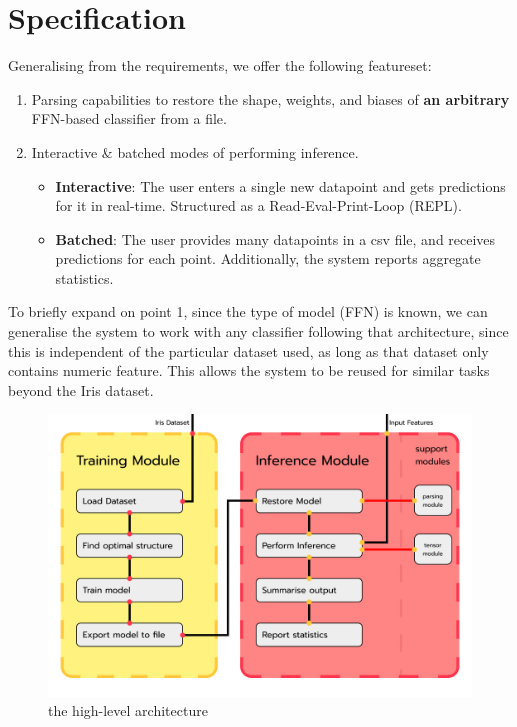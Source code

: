 \documentclass[12pt]{article}
\begin{document}
\section{Specification}
Generalising from the requirements, we offer the following featureset:
\begin{enumerate}
	\item Parsing capabilities to restore the shape, weights, and biases of \textbf{an arbitrary} FFN-based classifier from a file.
	\item Interactive \& batched modes of performing inference. \begin{itemize}
		\item \textbf{Interactive}: The user enters a single new datapoint and gets predictions for it in real-time. Structured as a Read-Eval-Print-Loop (REPL).
		\item \textbf{Batched}: The user provides many datapoints in a csv file, and receives predictions for each point. Additionally, the system reports aggregate statistics.
	\end{itemize}
\end{enumerate}
To briefly expand on point 1, since the type of model (FFN) is known, we can generalise the system to work with any classifier following that architecture, since this is independent of the particular dataset used, as long as that dataset only contains numeric feature. This allows the system to be reused for similar tasks beyond the Iris dataset.\bigskip

\begin{figure}
	\includegraphics[width=0.85\pdfpagewidth]{../images/modules.png}
	\caption{the high-level architecture}
\end{figure}
\end{document}
